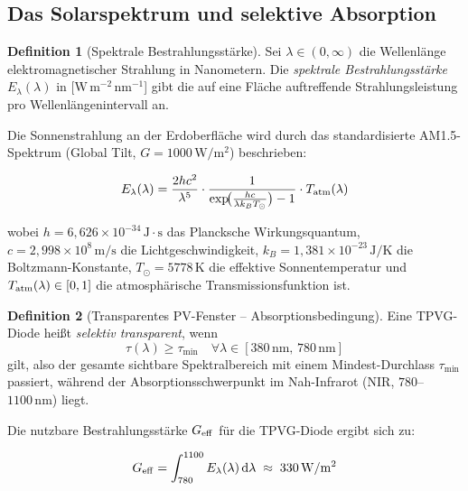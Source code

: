 ﻿\documentclass[a4paper,12pt]{article}
\theoremstyle{definition}
\newtheorem{definition}{Definition}[section]
\theoremstyle{remark}
\newcommand{\diff}{\mathrm{d}}
\begin{document}
\subsection{Das Solarspektrum und selektive Absorption}

\begin{definition}[Spektrale Bestrahlungsstärke]
Sei $\lambda \in (0, \infty)$ die Wellenlänge elektromagnetischer Strahlung in
Nanometern. Die \emph{spektrale Bestrahlungsstärke} $E_\lambda(\lambda)$ in
[$\mathrm{W\,m^{-2}\,nm^{-1}}$] gibt die auf eine Fläche auftreffende Strahlungsleistung
pro Wellenlängenintervall an.
\end{definition}

Die Sonnenstrahlung an der Erdoberfläche wird durch das standardisierte
AM1.5-Spektrum (Global Tilt, $G = 1000\,\mathrm{W/m^2}$) beschrieben:

\begin{equation}
  E_\lambda(\lambda) = \frac{2hc^2}{\lambda^5}
    \cdot \frac{1}{\exp\!\bigl(\frac{hc}{\lambda k_B T_\odot}\bigr) - 1}
    \cdot T_{\rm atm}(\lambda)
  \label{eq:planck}
\end{equation}

wobei $h = 6{,}626 \times 10^{-34}\,\mathrm{J\cdot s}$ das Plancksche
Wirkungsquantum, $c = 2{,}998 \times 10^8\,\mathrm{m/s}$ die Lichtgeschwindigkeit,
$k_B = 1{,}381 \times 10^{-23}\,\mathrm{J/K}$ die Boltzmann-Konstante,
$T_\odot = 5778\,\mathrm{K}$ die effektive Sonnentemperatur und
$T_{\rm atm}(\lambda) \in [0,1]$ die atmosphärische Transmissionsfunktion ist.

\begin{definition}[Transparentes PV-Fenster -- Absorptionsbedingung]
Eine TPVG-Diode heißt \emph{selektiv transparent}, wenn
\begin{equation}
  \tau(\lambda) \geq \tau_{\min} \quad \forall \lambda \in [380\,\mathrm{nm},\, 780\,\mathrm{nm}]
  \label{eq:selektiv}
\end{equation}
gilt, also der gesamte sichtbare Spektralbereich mit einem Mindest-Durchlass
$\tau_{\min}$ passiert, während der Absorptionsschwerpunkt im
Nah-Infrarot (NIR, $780$--$1100\,\mathrm{nm}$) liegt.
\end{definition}

Die nutzbare Bestrahlungsstärke $G_{\rm eff}$ für die TPVG-Diode ergibt sich zu:

\begin{equation}
  G_{\rm eff} = \int_{780}^{1100} E_\lambda(\lambda)\,\diff\lambda
  \;\approx\; 330\,\mathrm{W/m^2}
  \label{eq:geff}
\end{equation}
\end{document}
